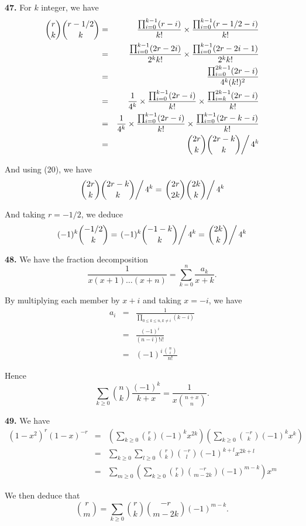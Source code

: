 \documentclass[a4paper,12pt]{article}
\newcommand{\newpar}[1]{\bigskip \noindent \textbf{#1.}}
\begin{document}
\newpar{47}  For $k$ integer, we have
\begin{eqnarray*}
  {r \choose k} {r-1/2 \choose k} &=&
  \frac{\prod_{i=0}^{k-1}(r-i)}{k!} \times
  \frac{\prod_{i=0}^{k-1}(r-1/2-i)}{k!} \\
  &=& \frac{\prod_{i=0}^{k-1}(2r-2i)}{2^kk!} \times
  \frac{\prod_{i=0}^{k-1}(2r-2i-1)}{2^kk!} \\
  &=& \frac{\prod_{i=0}^{2k-1}(2r-i)}{4^k (k!)^2} \\
  &=& \frac{1}{4^k} \times \frac{\prod_{i=0}^{k-1}(2r-i)}{k!} \times
  \frac{\prod_{i=k}^{2k-1}(2r-i)}{k!} \\
  &=& \frac{1}{4^k} \times \frac{\prod_{i=0}^{k-1}(2r-i)}{k!} \times
  \frac{\prod_{i=0}^{k-1}(2r-k-i)}{k!} \\
  &=& \left. {2r \choose k}{2r-k \choose k} \right/4^k
\end{eqnarray*}

And using (20), we have
\[ \left. {2r \choose k}{2r-k \choose k} \right/4^k = \left. {2r
  \choose 2k}{2k \choose k} \right/ 4^k\]

And taking $r = -1/2$, we deduce
\[ (-1)^k {-1/2 \choose k} = \left. (-1)^k {-1-k \choose k}\right/4^k = \left.
   {2k \choose k}\right/4^k\]

\newpar{48}  We have the fraction decomposition
\[ \frac{1}{x(x+1)\ldots(x+n)} = \sum_{k=0}^n \frac{a_k}{x+k}.\]

By multiplying each member by $x+i$ and taking $x = -i$, we have
\begin{eqnarray*}
  a_i &=& \frac{1}{\prod_{0\le k\le n, k\not=i} (k-i)} \\
  &=& \frac{(-1)^i}{(n-i)!i!} \\
  &=& (-1)^i \frac{{n \choose i}}{n!}
\end{eqnarray*}

Hence
\[ \sum_{k\ge 0} {n \choose k}\frac{(-1)^k}{k+x} = \frac{1}{x {n+x
    \choose n}}.\]

\newpar{49} We have
\begin{eqnarray*}
  (1-x^2)^r (1-x)^{-r} &=& \left( \sum_{k\ge 0} {r \choose k}(-1)^k
  x^{2k}\right) \left( \sum_{k\ge 0} {-r \choose k} (-1)^k x^k\right)
\\
&=& \sum_{k \ge 0} \sum_{l \ge 0} {r \choose k}{-r \choose l}
(-1)^{k+l} x^{2k+l} \\
&=& \sum_{m \ge 0} \left( \sum_{k \ge 0} {r \choose k}{-r \choose
  m-2k}(-1)^{m-k} \right) x^m
\end{eqnarray*}

We then deduce that
\[  {r \choose m} =  \sum_{k \ge 0} {r \choose k}{-r \choose
  m-2k}(-1)^{m-k} .\]
\end{document}
